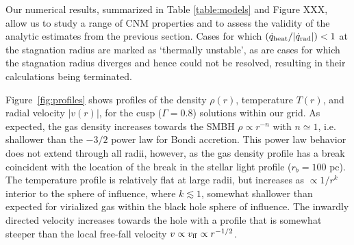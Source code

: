 \documentclass[usenatbib,fleqn]{mn2e}
\newcommand{\rb}{r_b}
\newcommand{\Mbh}[1][]{M_{\bullet#1}}
\begin{document}

Our numerical results, summarized in Table \ref{table:models} and Figure XXX, allow us to study a range of CNM properties and to assess the validity of the analytic estimates from the previous section.  Cases for which $(\dot{q}_{\rm heat}/|\dot{q}_{\rm rad}|)< 1$ at the stagnation radius are marked as `thermally unstable', as are cases for which the stagnation radius diverges and hence could not be resolved, resulting in their calculations being terminated.  

Figure~\ref{fig:profiles} shows profiles of the density $\rho(r)$,
temperature $T(r)$, and radial velocity $|v(r)|$, for the cusp
($\Gamma=0.8$) solutions within our grid.  As expected, the gas
density increases towards the SMBH $\rho\propto r^{-n}$ with
$n\simeq1$, i.e. shallower than the $-3/2$ power law for
Bondi accretion. This power law behavior does not extend
through all radii, however, as the gas density profile has a break coincident
with the location of the break in the stellar light profile ($\rb=100$
pc). The temperature profile is relatively flat at large radii, but
increases as $\propto 1/r^{k}$ interior to the sphere of influence,
where $k\lesssim 1$, somewhat shallower than expected for virialized gas within the black hole sphere of influence.
The inwardly directed velocity increases towards the hole with a profile that is somewhat steeper than the local free-fall velocity $v \propto v_{\rm ff}\propto r^{-1/2}$.
\end{document}
